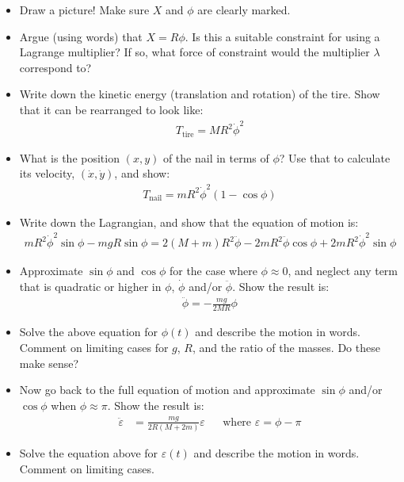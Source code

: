 \documentclass{article}
\begin{document}
\begin{itemize}
    \item Draw a picture! Make sure $X$ and $\phi$ are clearly marked.
    \item Argue (using words) that $X = R\phi$. Is this a suitable constraint for using a Lagrange multiplier? If so, what force of constraint would the multiplier $\lambda$ correspond to?
    \item Write down the kinetic energy (translation and rotation) of the tire. Show that it can be rearranged to look like:
    \begin{align*}
        T_\text{tire} = M R^2 \dot{\phi}^2
    \end{align*}
    \item What is the position $(x, y)$ of the nail in terms of $\phi$? Use that to calculate its velocity, $(\dot{x}, \dot{y})$, and show:
    \begin{align*}
        T_\text{nail} = m R^2 \dot{\phi}^2 \left( 1 - \cos \phi \right) 
    \end{align*}
    \item Write down the Lagrangian, and show that the equation of motion is:
    \begin{align*}
        m R^2 \dot{\phi}^2 \sin\phi - m g R \sin\phi = 2 (M+m) R^2 \ddot{\phi} - 2 m R^2 \ddot{\phi} \cos\phi + 2 m R^2 \dot{\phi}^2 \sin\phi
    \end{align*}
    \item Approximate $\sin\phi$ and $\cos\phi$ for the case where $\phi \approx 0$, and neglect any term that is quadratic or higher in $\phi$, $\dot{\phi}$ and/or $\ddot{\phi}$. Show the result is:
    \begin{align*}
        \ddot{\phi} = -\frac{m g}{2 M R} \phi
    \end{align*}
    \item Solve the above equation for $\phi(t)$ and describe the motion in words. Comment on limiting cases for $g$, $R$, and the ratio of the masses. Do these make sense?
    \item Now go back to the full equation of motion and approximate $\sin\phi$ and/or $\cos\phi$ when $\phi \approx \pi$. Show the result is:
    \begin{align*}
        \ddot{\varepsilon} &= \frac{mg}{2R(M+2m)} \varepsilon & &\text{where $\varepsilon=\phi - \pi$}
    \end{align*}
    \item Solve the equation above for $\varepsilon(t)$ and describe the motion in words. Comment on limiting cases. 
    
\end{itemize}
\end{document}

